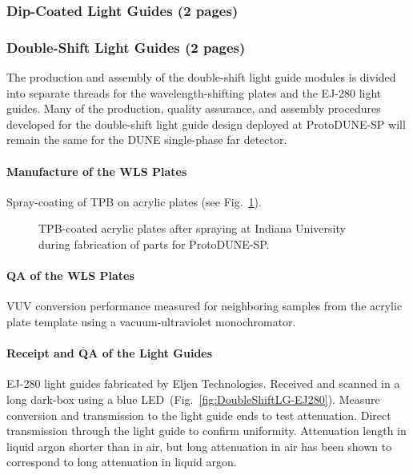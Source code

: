 \subsubsection{Dip-Coated Light Guides (2 pages)}
\label{ssec:fdsp-pd-pc-prod-bar1}

\subsubsection{Double-Shift Light Guides (2 pages)}
\label{ssec:fdsp-pd-pc-prod-bar2}

The production and assembly of the double-shift light guide modules is divided 
into separate threads for the wavelength-shifting plates and the EJ-280 light guides. 
Many of the production, quality assurance, and assembly procedures developed for the
 double-shift light guide design deployed at ProtoDUNE-SP will remain the same for 
the DUNE single-phase far detector.

\paragraph*{Manufacture of the WLS Plates}

Spray-coating of TPB on acrylic plates (see Fig.~\ref{fig:DoubleShiftLG-SprayedPlates}).

\begin{figure}[ht]
  \begin{center}
  \caption{TPB-coated acrylic plates after spraying at Indiana University 
during fabrication of parts for ProtoDUNE-SP.}\label{fig:DoubleShiftLG-SprayedPlates}
  \end{center}
\end{figure}

\paragraph*{QA of the WLS Plates}

VUV conversion performance measured for neighboring samples from the 
acrylic plate template using a vacuum-ultraviolet monochromator.

\paragraph*{Receipt and QA of the Light Guides}

EJ-280 light guides fabricated by Eljen Technologies. Received and scanned in a 
long dark-box using a blue LED~(Fig.~\ref{fig:DoubleShiftLG-EJ280}).
 Measure conversion and transmission to the light guide ends to test attenuation. 
Direct transmission through the light guide to confirm uniformity. 
Attenuation length in liquid argon shorter than in air, but long attenuation in 
air has been shown to correspond to long attenuation in liquid argon.


